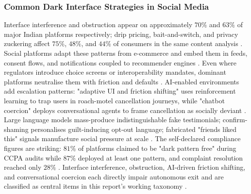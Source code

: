 \documentclass[11pt]{article}
\begin{document}
\subsubsection{Common Dark Interface Strategies in Social Media}
\label{sec:common_dark_interface_social} Interface interference and obstruction appear on approximately $70\%$ and $63\%$ of major Indian platforms respectively; drip pricing, bait-and-switch, and privacy zuckering affect $75\%$, $48\%$, and $44\%$ of consumers in the same content analysis \parencites[7]{6295677}[9]{6295677}. Social platforms adapt these patterns from e-commerce and embed them in feeds, consent flows, and notifications coupled to recommender engines \parencites[7]{6295677}[3]{6087241}. Even where regulators introduce choice screens or interoperability mandates, dominant platforms neutralise them with friction and defaults \parencites[3]{1070605}[10]{1070605}. AI-enabled environments add escalation patterns: "adaptive UI and friction shifting" uses reinforcement learning to trap users in roach-motel cancellation journeys, while "chatbot coercion" deploys conversational agents to frame cancellation as socially deviant \parencites[11]{7896734}. Large language models mass-produce indistinguishable fake testimonials; confirm-shaming personalises guilt-inducing opt-out language; fabricated "friends liked this" signals manufacture social pressure at scale \parencites[11]{7896734}. The self-declared compliance figures are striking: $81\%$ of platforms claimed to be "dark pattern free" during CCPA audits while $87\%$ deployed at least one pattern, and complaint resolution reached only $28\%$ \parencites[7]{6295677}[12]{6295677}. Interface interference, obstruction, AI-driven friction shifting, and conversational coercion each directly impair autonomous exit and are classified as central items in this report's working taxonomy \parencites[3]{6087241}[7]{6295677}[11]{7896734}.
\end{document}
